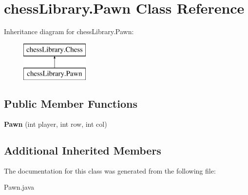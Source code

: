\hypertarget{classchess_library_1_1_pawn}{}\section{chess\+Library.\+Pawn Class Reference}
\label{classchess_library_1_1_pawn}
Inheritance diagram for chess\+Library.\+Pawn\+:\begin{figure}[H]
\begin{center}
\leavevmode
\includegraphics[height=2.000000cm]{classchess_library_1_1_pawn}
\end{center}
\end{figure}
\subsection*{Public Member Functions}
\begin{DoxyCompactItemize}
\item 
\mbox{\label{classchess_library_1_1_pawn_a4109bd5acf3c39d99a3b77fcf2e92dfe}} 
{\bfseries Pawn} (int player, int row, int col)
\end{DoxyCompactItemize}
\subsection*{Additional Inherited Members}


The documentation for this class was generated from the following file\+:\begin{DoxyCompactItemize}
\item 
Pawn.\+java\end{DoxyCompactItemize}
